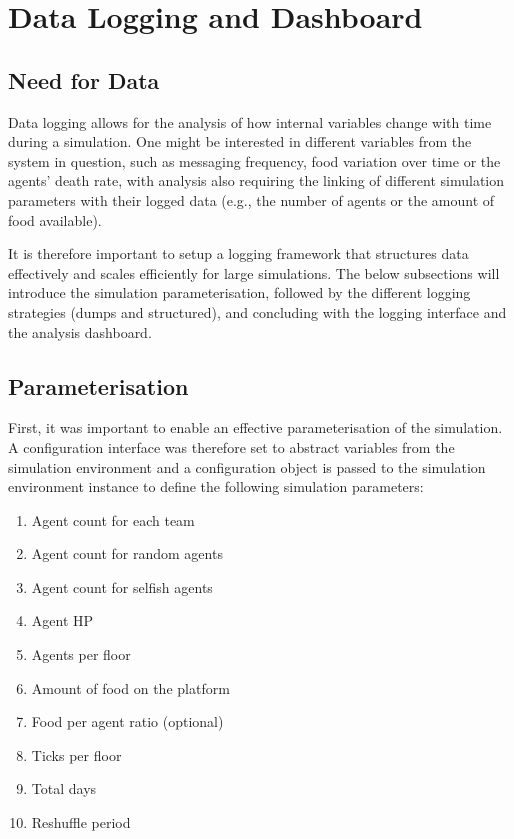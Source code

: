 \chapter{Data Logging and Dashboard}\label{data_logging}

\section{Need for Data}

Data logging allows for the analysis of how internal variables change with time during a simulation. One might be interested in different variables from the system in question, such as messaging frequency, food variation over time or the agents' death rate, with analysis also requiring the linking of different simulation parameters with their logged data (e.g., the number of agents or the amount of food available). 

It is therefore important to setup a logging framework that structures data effectively and scales efficiently for large simulations. The below subsections will introduce the simulation parameterisation, followed by the different logging strategies (dumps and structured), and concluding with the logging interface and the analysis dashboard.

\section{Parameterisation}

First, it was important to enable an effective parameterisation of the simulation. A configuration interface was therefore set to abstract variables from the simulation environment and a configuration object is passed to the simulation environment instance to define the following simulation parameters:

\begin{multicols}{2}
    \begin{enumerate}
        \item Agent count for each team
        \item Agent count for random agents
        \item Agent count for selfish agents
        \item Agent HP
        \item Agents per floor
        \item Amount of food on the platform
        \item Food per agent ratio (optional)
        \item Ticks per floor
        \item Total days
        \item Reshuffle period
    \end{enumerate}
\end{multicols}

